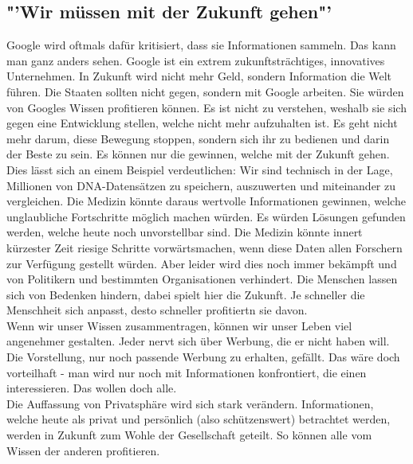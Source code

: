\subsection{"'Wir müssen mit der Zukunft gehen"'}
Google wird oftmals dafür kritisiert, dass sie Informationen sammeln. 
Das kann man ganz anders sehen. Google ist ein extrem zukunftsträchtiges, 
innovatives Unternehmen. In Zukunft wird nicht mehr Geld, sondern 
Information die Welt führen. Die Staaten sollten nicht gegen, sondern 
mit Google arbeiten. Sie würden von Googles Wissen profitieren können.
Es ist nicht zu verstehen, weshalb sie sich gegen eine Entwicklung stellen, welche 
nicht mehr aufzuhalten ist. Es geht nicht mehr darum, diese Bewegung 
stoppen, sondern sich ihr zu bedienen und darin der Beste zu sein. Es 
können nur die gewinnen, welche mit der Zukunft gehen.\\
Dies l\"asst sich an einem Beispiel verdeutlichen: Wir sind technisch in 
der Lage, Millionen von DNA-Datensätzen zu speichern, auszuwerten und 
miteinander zu vergleichen. Die Medizin könnte daraus wertvolle 
Informationen gewinnen, welche unglaubliche Fortschritte möglich machen 
würden. Es würden Lösungen gefunden werden, welche heute noch unvorstellbar 
sind. Die Medizin könnte innert kürzester Zeit riesige Schritte 
vorwärtsmachen, wenn diese Daten allen Forschern zur Verfügung gestellt 
würden. Aber leider wird dies noch immer bekämpft und von Politikern 
und bestimmten Organisationen verhindert. Die Menschen lassen sich von Bedenken 
hindern, dabei spielt hier die Zukunft. Je schneller die Menschheit sich anpasst, 
desto schneller profitiertn sie davon.\\
Wenn wir unser Wissen zusammentragen, können wir unser Leben viel 
angenehmer gestalten. Jeder nervt sich über Werbung, die er nicht haben 
will. Die Vorstellung, nur noch passende 
Werbung zu erhalten, gef\"allt. Das wäre doch vorteilhaft - man wird nur noch mit 
Informationen konfrontiert, die einen interessieren. Das wollen doch 
alle.\\
Die Auffassung von Privatsphäre wird sich stark 
verändern. Informationen, welche heute als privat und persönlich 
(also schützenswert) betrachtet werden, werden in Zukunft zum Wohle der 
Gesellschaft geteilt. So können alle vom Wissen der anderen profitieren.

